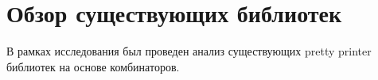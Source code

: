 \section{Обзор существующих библиотек}

В рамках исследования был проведен анализ существующих pretty printer библиотек на основе комбинаторов.



